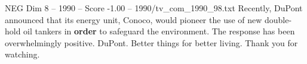 \begin{textsample}{NEG Dim 8 – 1990 – Score -1.00 – 1990/tv\_com\_1990\_98.txt}  \label{ex:f8_neg_022}
Recently, DuPont announced that its energy unit, Conoco, would pioneer the use of new double-hold oil tankers in \textbf{order} to safeguard the environment.
The response has been overwhelmingly positive.
DuPont.
Better things for better living.
Thank you for watching.

\end{textsample}

